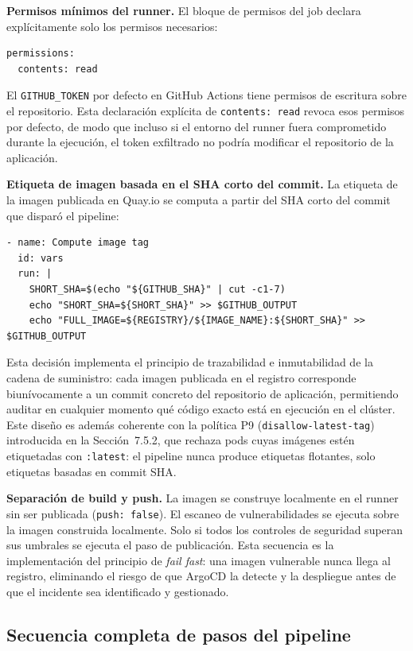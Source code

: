 \textbf{Permisos mínimos del runner.} El bloque de permisos del job declara explícitamente solo los permisos necesarios:

\begin{lstlisting}
permissions:
  contents: read
\end{lstlisting}

El \texttt{GITHUB\_TOKEN} por defecto en GitHub Actions tiene permisos de escritura sobre el repositorio. Esta declaración explícita de \texttt{contents: read} revoca esos permisos por defecto, de modo que incluso si el entorno del runner fuera comprometido durante la ejecución, el token exfiltrado no podría modificar el repositorio de la aplicación.

\textbf{Etiqueta de imagen basada en el SHA corto del commit.} La etiqueta de la imagen publicada en Quay.io se computa a partir del SHA corto del commit que disparó el pipeline:

\begin{lstlisting}
- name: Compute image tag
  id: vars
  run: |
    SHORT_SHA=$(echo "${GITHUB_SHA}" | cut -c1-7)
    echo "SHORT_SHA=${SHORT_SHA}" >> $GITHUB_OUTPUT
    echo "FULL_IMAGE=${REGISTRY}/${IMAGE_NAME}:${SHORT_SHA}" >> $GITHUB_OUTPUT
\end{lstlisting}

Esta decisión implementa el principio de trazabilidad e inmutabilidad de la cadena de suministro: cada imagen publicada en el registro corresponde biunívocamente a un commit concreto del repositorio de aplicación, permitiendo auditar en cualquier momento qué código exacto está en ejecución en el clúster. Este diseño es además coherente con la política P9 (\texttt{disallow-latest-tag}) introducida en la Sección~7.5.2, que rechaza pods cuyas imágenes estén etiquetadas con \texttt{:latest}: el pipeline nunca produce etiquetas flotantes, solo etiquetas basadas en commit SHA.

\textbf{Separación de build y push.} La imagen se construye localmente en el runner sin ser publicada (\texttt{push: false}). El escaneo de vulnerabilidades se ejecuta sobre la imagen construida localmente. Solo si todos los controles de seguridad superan sus umbrales se ejecuta el paso de publicación. Esta secuencia es la implementación del principio de \textit{fail fast}: una imagen vulnerable nunca llega al registro, eliminando el riesgo de que ArgoCD la detecte y la despliegue antes de que el incidente sea identificado y gestionado.

\subsection{Secuencia completa de pasos del pipeline}

